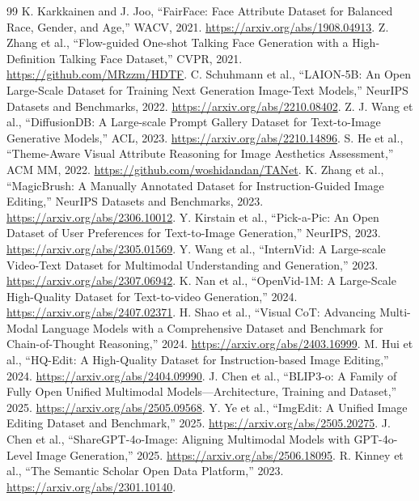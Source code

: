 ﻿\documentclass[11pt,a4paper]{article}
\begin{document}
\begin{thebibliography}{99}
 K. Karkkainen and J. Joo, ``FairFace: Face Attribute Dataset for Balanced Race, Gender, and Age,'' WACV, 2021. \url{https://arxiv.org/abs/1908.04913}.
 Z. Zhang et al., ``Flow-guided One-shot Talking Face Generation with a High-Definition Talking Face Dataset,'' CVPR, 2021. \url{https://github.com/MRzzm/HDTF}.
 C. Schuhmann et al., ``LAION-5B: An Open Large-Scale Dataset for Training Next Generation Image-Text Models,'' NeurIPS Datasets and Benchmarks, 2022. \url{https://arxiv.org/abs/2210.08402}.
 Z. J. Wang et al., ``DiffusionDB: A Large-scale Prompt Gallery Dataset for Text-to-Image Generative Models,'' ACL, 2023. \url{https://arxiv.org/abs/2210.14896}.
 S. He et al., ``Theme-Aware Visual Attribute Reasoning for Image Aesthetics Assessment,'' ACM MM, 2022. \url{https://github.com/woshidandan/TANet}.
 K. Zhang et al., ``MagicBrush: A Manually Annotated Dataset for Instruction-Guided Image Editing,'' NeurIPS Datasets and Benchmarks, 2023. \url{https://arxiv.org/abs/2306.10012}.
 Y. Kirstain et al., ``Pick-a-Pic: An Open Dataset of User Preferences for Text-to-Image Generation,'' NeurIPS, 2023. \url{https://arxiv.org/abs/2305.01569}.
 Y. Wang et al., ``InternVid: A Large-scale Video-Text Dataset for Multimodal Understanding and Generation,'' 2023. \url{https://arxiv.org/abs/2307.06942}.
 K. Nan et al., ``OpenVid-1M: A Large-Scale High-Quality Dataset for Text-to-video Generation,'' 2024. \url{https://arxiv.org/abs/2407.02371}.
 H. Shao et al., ``Visual CoT: Advancing Multi-Modal Language Models with a Comprehensive Dataset and Benchmark for Chain-of-Thought Reasoning,'' 2024. \url{https://arxiv.org/abs/2403.16999}.
 M. Hui et al., ``HQ-Edit: A High-Quality Dataset for Instruction-based Image Editing,'' 2024. \url{https://arxiv.org/abs/2404.09990}.
 J. Chen et al., ``BLIP3-o: A Family of Fully Open Unified Multimodal Models---Architecture, Training and Dataset,'' 2025. \url{https://arxiv.org/abs/2505.09568}.
 Y. Ye et al., ``ImgEdit: A Unified Image Editing Dataset and Benchmark,'' 2025. \url{https://arxiv.org/abs/2505.20275}.
 J. Chen et al., ``ShareGPT-4o-Image: Aligning Multimodal Models with GPT-4o-Level Image Generation,'' 2025. \url{https://arxiv.org/abs/2506.18095}.
 R. Kinney et al., ``The Semantic Scholar Open Data Platform,'' 2023. \url{https://arxiv.org/abs/2301.10140}.

\end{thebibliography}
\end{document}
